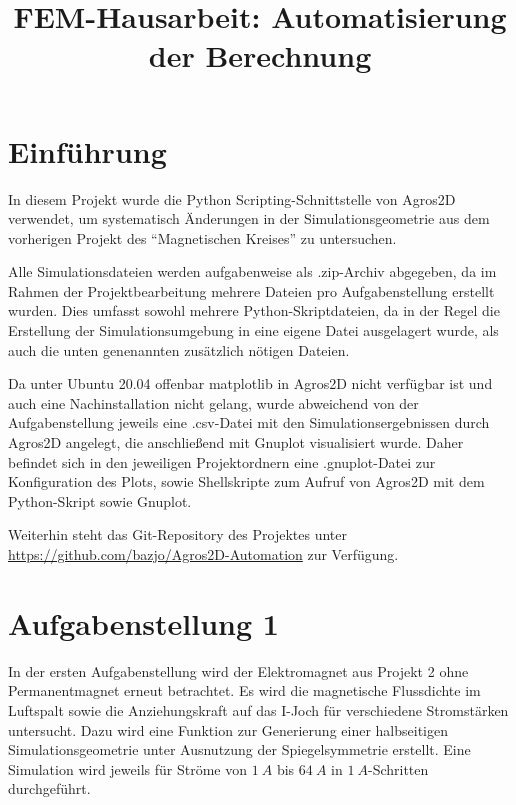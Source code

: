 \documentclass[conference,a4paper,twoside]{IEEEtran}
\begin{document}
\title{FEM-Hausarbeit: Automatisierung der Berechnung}

\author{
}

\maketitle


\section{Einführung}
In diesem Projekt wurde die Python Scripting-Schnittstelle von Agros2D verwendet, um systematisch Änderungen in der Simulationsgeometrie aus dem vorherigen Projekt des ``Magnetischen Kreises'' zu untersuchen.

Alle Simulationsdateien werden aufgabenweise als .zip-Archiv abgegeben, da im Rahmen der Projektbearbeitung mehrere Dateien pro Aufgabenstellung erstellt wurden. Dies umfasst sowohl mehrere Python-Skriptdateien, da in der Regel die Erstellung der Simulationsumgebung in eine eigene Datei ausgelagert wurde, als auch die unten genenannten zusätzlich nötigen Dateien.

Da unter Ubuntu 20.04 offenbar matplotlib in Agros2D nicht verfügbar ist und auch eine Nachinstallation nicht gelang, wurde abweichend von der Aufgabenstellung jeweils eine .csv-Datei mit den Simulationsergebnissen durch Agros2D angelegt, die anschließend mit Gnuplot visualisiert wurde. Daher befindet sich in den jeweiligen Projektordnern eine .gnuplot-Datei zur Konfiguration des Plots, sowie Shellskripte zum Aufruf von Agros2D mit dem Python-Skript sowie Gnuplot.

Weiterhin steht das Git-Repository des Projektes unter \url{https://github.com/bazjo/Agros2D-Automation} zur Verfügung.

\section{Aufgabenstellung 1}
In der ersten Aufgabenstellung wird der Elektromagnet aus Projekt 2 ohne Permanentmagnet erneut betrachtet. Es wird die magnetische Flussdichte im Luftspalt sowie die Anziehungskraft auf das I-Joch für verschiedene Stromstärken untersucht. Dazu wird eine Funktion zur Generierung einer halbseitigen Simulationsgeometrie unter Ausnutzung der Spiegelsymmetrie erstellt. Eine Simulation wird jeweils für Ströme von $1\ A$ bis $64\ A$ in $1\ A$-Schritten durchgeführt.
\end{document}
